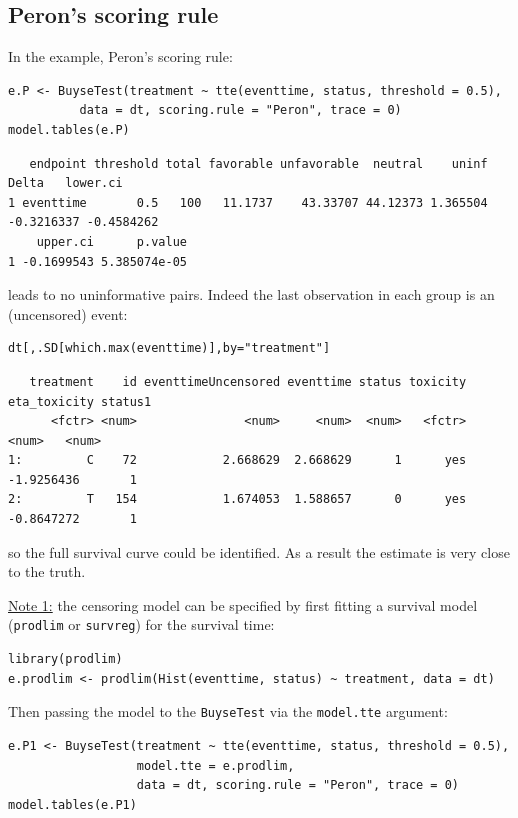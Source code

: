 \documentclass[12pt]{article}
\begin{document}
\subsection{Peron's scoring rule}
\label{sec:orgecc0c56}
In the example, Peron's scoring rule:
\lstset{language=r,label= ,caption= ,captionpos=b,numbers=none}
\begin{lstlisting}
e.P <- BuyseTest(treatment ~ tte(eventtime, status, threshold = 0.5),
          data = dt, scoring.rule = "Peron", trace = 0)
model.tables(e.P)
\end{lstlisting}

\begin{verbatim}
   endpoint threshold total favorable unfavorable  neutral    uninf      Delta   lower.ci
1 eventtime       0.5   100   11.1737    43.33707 44.12373 1.365504 -0.3216337 -0.4584262
    upper.ci      p.value
1 -0.1699543 5.385074e-05
\end{verbatim}


leads to no uninformative pairs. Indeed the last observation in each
group is an (uncensored) event:
\lstset{language=r,label= ,caption= ,captionpos=b,numbers=none}
\begin{lstlisting}
dt[,.SD[which.max(eventtime)],by="treatment"]
\end{lstlisting}

\begin{verbatim}
   treatment    id eventtimeUncensored eventtime status toxicity eta_toxicity status1
      <fctr> <num>               <num>     <num>  <num>   <fctr>        <num>   <num>
1:         C    72            2.668629  2.668629      1      yes   -1.9256436       1
2:         T   154            1.674053  1.588657      0      yes   -0.8647272       1
\end{verbatim}

so the full survival curve could be identified. As a result the estimate is very close to the
truth. 

\bigskip

\noindent \uline{Note 1:} the censoring model can be specified by first fitting a
survival model (\texttt{prodlim} or \texttt{survreg}) for the survival time:
\lstset{language=r,label= ,caption= ,captionpos=b,numbers=none}
\begin{lstlisting}
library(prodlim)
e.prodlim <- prodlim(Hist(eventtime, status) ~ treatment, data = dt)
\end{lstlisting}

Then passing the model to the \texttt{BuyseTest} via the \texttt{model.tte} argument:
\lstset{language=r,label= ,caption= ,captionpos=b,numbers=none}
\begin{lstlisting}
e.P1 <- BuyseTest(treatment ~ tte(eventtime, status, threshold = 0.5),
                  model.tte = e.prodlim,
                  data = dt, scoring.rule = "Peron", trace = 0)
model.tables(e.P1)
\end{lstlisting}
\end{document}
